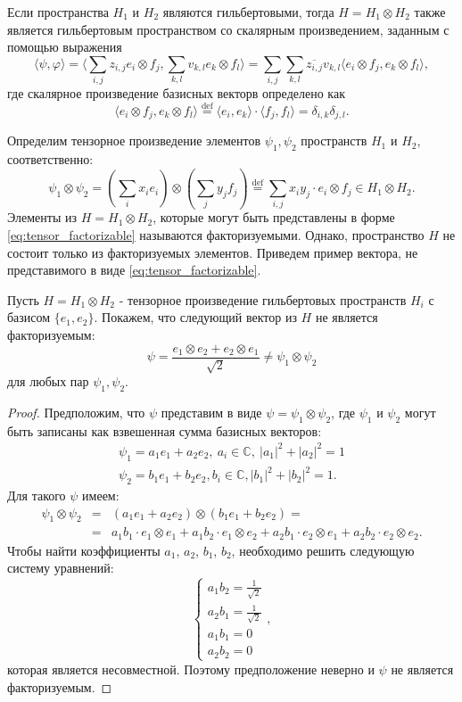 \documentclass[%
master,         %
subf,           %
href,           %
,times         %
]{disser}
\numberwithin{equation}{section}
\numberwithin{figure}{section}
\begin{document}
Если пространства $H_1$ и $H_2$ являются гильбертовыми, тогда $H = H_1\otimes H_2$ также является гильбертовым пространством со скалярным произведением, заданным с помощью выражения
\[
\langle\psi, \varphi\rangle = \langle \sum_{i,j}z_{i,j}e_i\otimes f_j, \sum_{k,l}v_{k,l}e_k\otimes f_l \rangle = \sum_{i, j}\sum_{k, l}\overline{z_{i,j}}v_{k,l} \langle e_i\otimes f_j, e_k\otimes f_l \rangle,
\]
где скалярное произведение базисных векторв определено как
\[
\langle e_i\otimes f_j, e_k\otimes f_l \rangle \overset{\mbox{def}}= \langle e_i, e_k\rangle \cdot \langle f_j, f_l \rangle = \delta_{i, k}\delta_{j, l}.
\]

Определим тензорное произведение элементов $\psi_1, \psi_2$ пространств $H_1$ и $H_2$, соответственно:
\begin{equation}
\psi_1 \otimes \psi_2 = \left(\sum_ix_ie_i\right) \otimes \left(\sum_jy_jf_j\right) \overset{\mbox{def}}= \sum_{i, j} x_iy_j \cdot e_i \otimes f_j \in H_1 \otimes H_2.
\label{eq:tensor_factorizable}
\end{equation}
Элементы из $H = H_1\otimes H_2$, которые могут быть представлены в форме \eqref{eq:tensor_factorizable} называются факторизуемыми. Однако, пространство $H$ не состоит только из факторизуемых элементов. Приведем пример вектора, не представимого в виде \eqref{eq:tensor_factorizable}.

Пусть $H = H_1\otimes H_2$ - тензорное произведение гильбертовых пространств $H_i$ с базисом $\{e_1, e_2\}$. Покажем, что следующий вектор из $H$ не является факторизуемым: 
\[
	\psi = \frac{e_1 \otimes e_2 + e_2 \otimes e_1}{\sqrt{2}} \ne \psi_1 \otimes \psi_2
\]
для любых пар $\psi_1, \psi_2$.
\begin{proof}
Предположим, что $\psi$ представим в виде $\psi = \psi_1\otimes\psi_2$, где 
$\psi_1$ и $\psi_2$ могут быть записаны как взвешенная сумма базисных векторов:
\begin{gather*}
	\psi_1 = a_1 e_1 + a_2 e_2,\ a_i\in \mathbb{C},\ |a_1|^2 + |a_2|^2 = 1 \\
	\psi_2 = b_1 e_1 + b_2 e_2, b_i\in \mathbb{C}, |b_1|^2 + |b_2|^2 = 1.
\end{gather*}
Для такого $\psi$ имеем:
\begin{eqnarray*}
	\psi_1 \otimes \psi_2 &=& (a_1 e_1 + a_2 e_2) \otimes (b_1 e_1 + b_2 e_2) = \\ &=&  
	a_1 b_1 \cdot e_1 \otimes e_1 + a_1 b_2 \cdot e_1 \otimes e_2 + 
	a_2 b_1 \cdot e_2 \otimes e_1 + a_2 b_2 \cdot e_2 \otimes e_2.
\end{eqnarray*}
Чтобы найти коэффициенты $a_1$, $a_2$, $b_1$, $b_2$, необходимо решить следующую систему уравнений:
$$
\begin{cases}
a_1 b_2 = \frac{1}{\sqrt{2}} \\
a_2 b_1 = \frac{1}{\sqrt{2}} \\
a_1 b_1 = 0 \\
a_2 b_2 = 0
\end{cases},
$$
которая является несовместной. Поэтому предположение неверно и $\psi$ не является факторизуемым.
\end{proof}
 
\end{document}
